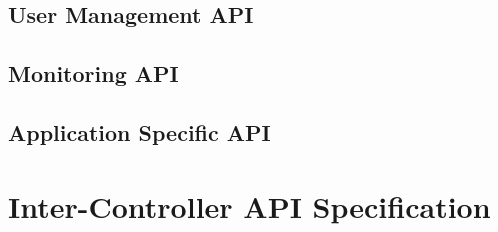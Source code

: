\documentclass[a4paper]{report}
\begin{document}
\section{User Management API}

\section{Monitoring API}

\section{Application Specific API}




\chapter{Inter-Controller API Specification}
\end{document}

